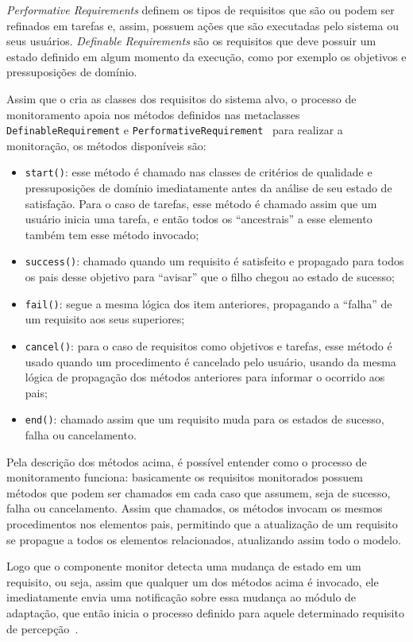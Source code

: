 \textit{Performative Requirements} definem os tipos de requisitos que são ou podem ser refinados em tarefas e, assim, possuem ações que são executadas pelo sistema ou seus usuários. \textit{Definable Requirements} são os requisitos que deve possuir um estado definido em algum momento da execução, como por exemplo os objetivos e pressuposições de domínio.

Assim que o \zanshin cria as classes dos requisitos do sistema alvo, o processo de monitoramento apoia nos métodos definidos nas metaclasses \texttt{DefinableRequirement} e \texttt{PerformativeRequirement}~\cite{tesevitor} para realizar a monitoração, os métodos disponíveis são:
\begin{itemize}
	\item \texttt{start()}: esse método é chamado nas classes de critérios de qualidade e pressuposições de domínio imediatamente antes da análise de seu estado de satisfação. Para o caso de tarefas, esse método é chamado assim que um usuário inicia uma tarefa, e então todos os ``ancestrais'' a esse elemento também tem esse método invocado;
	\item \texttt{success()}: chamado quando um requisito é satisfeito e propagado para todos os pais desse objetivo para ``avisar'' que o filho chegou ao estado de sucesso;
	\item \texttt{fail()}: segue a mesma lógica dos item anteriores, propagando a ``falha'' de um requisito aos seus superiores;
	\item \texttt{cancel()}: para o caso de requisitos como objetivos e tarefas, esse método é usado quando um procedimento é cancelado pelo usuário, usando da mesma lógica de propagação dos métodos anteriores para informar o ocorrido aos pais;
	\item \texttt{end()}: chamado assim que um requisito muda para os estados de sucesso, falha ou cancelamento.
\end{itemize}

Pela descrição dos métodos acima, é possível entender como o processo de monitoramento funciona: basicamente os requisitos monitorados possuem métodos que podem ser chamados em cada caso que assumem, seja de sucesso, falha ou cancelamento. Assim que chamados, os métodos invocam os mesmos procedimentos nos elementos pais, permitindo que a atualização de um requisito se propague a todos os elementos relacionados, atualizando assim todo o modelo.

Logo que o componente monitor detecta uma mudança de estado em um requisito, ou seja, assim que qualquer um dos métodos acima é invocado, ele imediatamente envia uma notificação sobre essa mudança ao módulo de adaptação, que então inicia o processo definido para aquele determinado requisito de percepção~\cite{tesevitor}.

